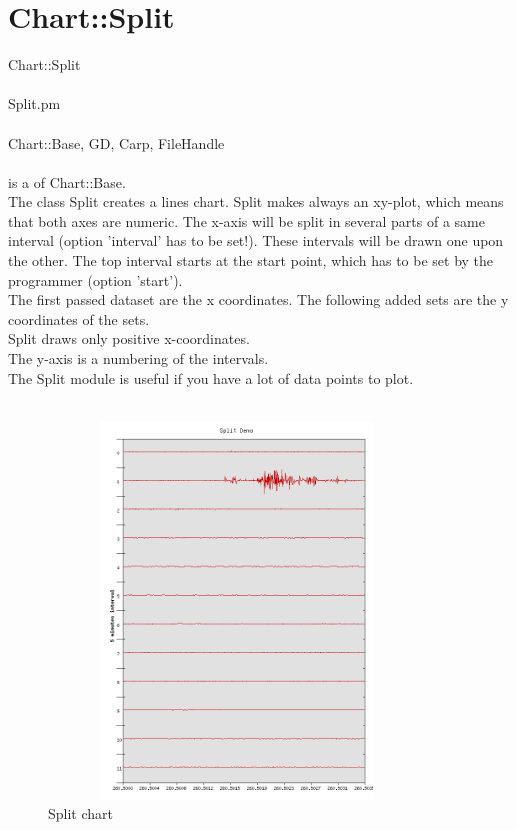 \section{Chart::Split}
 Chart::Split\\ \\
 Split.pm\\ \\
Chart::Base, GD, Carp, FileHandle\\ \\
  is a  of Chart::Base.\\
The class Split creates a lines chart. Split makes always an xy-plot, which means that both axes are numeric. The x-axis will be split in several parts of a same interval (option 'interval' has to be set!). These intervals will be drawn one upon the other. The top interval starts at the start point, which has to be set by the programmer (option 'start'). \\
The first passed dataset are the x coordinates. The following added sets are the y coordinates of the sets.\\
Split draws only positive x-coordinates.\\
The y-axis is a numbering of the intervals.\\
The Split module is useful if you have a lot of data points to plot.\\ 
\\
\begin{figure}[h]
	\begin{center}
		\includegraphics[width = 10cm, height =10cm]{stunde.png}
	\end{center}
	\caption{Split chart}
	\label{fig:split}
\end{figure}
